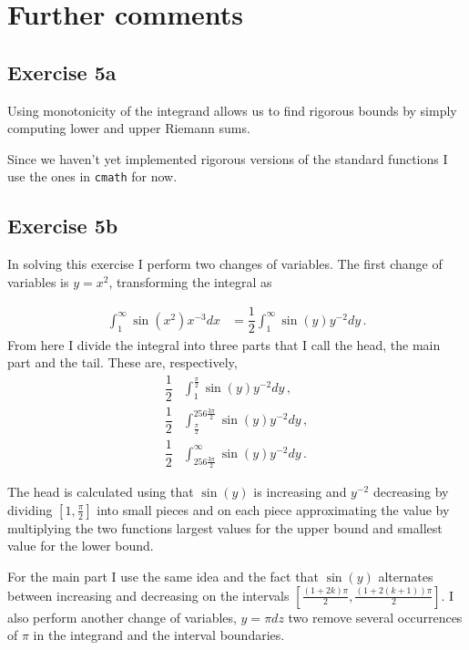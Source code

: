 \documentclass[a4paper, 11 pt]{amsart}
\theoremstyle{definition}
\theoremstyle{remark}
\numberwithin{equation}{section}
\begin{document}
\thispagestyle{fancy}

\hfill

\section*{Further comments}

\subsection*{Exercise 5a}

Using monotonicity of the integrand allows us to find rigorous bounds by simply
computing lower and upper Riemann sums.

Since we haven't yet implemented rigorous versions of the standard functions I
use the ones in \texttt{cmath} for now.
\subsection*{Exercise 5b}

In solving this exercise I perform two changes of variables. The first change 
of variables is $ y=x^{2} $, transforming the integral as

\begin{align*}
	\int_{1}^{\infty}\sin(x^{2})x^{-3}dx 
	& = \dfrac{1}{2}\int_{1}^{\infty}\sin(y)y^{-2}dy \, .
\end{align*}
From here I divide the integral into three parts that I call the head, the main 
part and the tail. These are, respectively,
\begin{align*}
	\dfrac{1}{2} & \int_{1}^{\frac{\pi}{2}}\sin(y)y^{-2}dy \, , \\
	\dfrac{1}{2} & \int_{\frac{\pi}{2}}^{256\frac{3\pi}{2}}\sin(y)y^{-2}dy \, , 
	\\
	\dfrac{1}{2} & \int_{256\frac{3\pi}{2}}^{\infty}\sin(y)y^{-2}dy \, .
\end{align*}

The head is calculated using that $ \sin(y) $ is increasing and $ y^{-2} $ 
decreasing by dividing $ \left[1,\frac{\pi}{2}\right] $ into small pieces and 
on each piece approximating the value by multiplying the two functions largest 
values for the upper bound and smallest value for the lower bound.

For the main part I use the same idea and the fact that $ \sin(y) $ alternates 
between increasing and decreasing on the intervals $ \left[ 
\frac{(1+2k)\pi}{2},\frac{(1+2(k+1))\pi}{2} \right] $. I also perform another 
change of variables, $ y=\pi dz $ two remove several occurrences of $ \pi $ in 
the integrand and the interval boundaries.  
\end{document}
